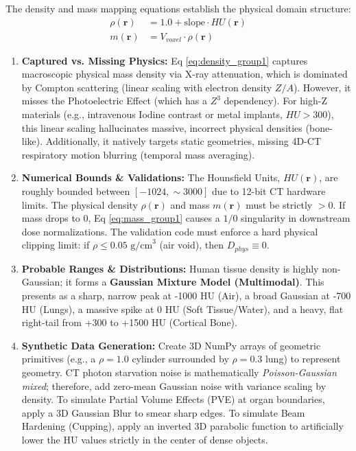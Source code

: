 \documentclass[11pt,a4paper]{article}
\begin{document}
The density and mass mapping equations establish the physical domain structure:
\begin{align}
    \rho(\mathbf{r}) &= 1.0 + \text{slope} \cdot HU(\mathbf{r}) \label{eq:density_group1} \\
    m(\mathbf{r}) &= V_{voxel} \cdot \rho(\mathbf{r}) \label{eq:mass_group1}
\end{align}

\begin{enumerate}
    \item \textbf{Captured vs. Missing Physics:} Eq \ref{eq:density_group1} captures macroscopic physical mass density via X-ray attenuation, which is dominated by Compton scattering (linear scaling with electron density $Z/A$). However, it misses the Photoelectric Effect (which has a $Z^3$ dependency). For high-Z materials (e.g., intravenous Iodine contrast or metal implants, $HU > 300$), this linear scaling hallucinates massive, incorrect physical densities (bone-like). Additionally, it natively targets static geometries, missing 4D-CT respiratory motion blurring (temporal mass averaging).
    \item \textbf{Numerical Bounds \& Validations:} The Hounsfield Units, $HU(\mathbf{r})$, are roughly bounded between $[-1024, \sim 3000]$ due to 12-bit CT hardware limits. The physical density $\rho(\mathbf{r})$ and mass $m(\mathbf{r})$ must be strictly $> 0$. If mass drops to 0, Eq \ref{eq:mass_group1} causes a $1/0$ singularity in downstream dose normalizations. The validation code must enforce a hard physical clipping limit: if $\rho \le 0.05 \text{ g/cm}^3$ (air void), then $D_{phys} \equiv 0$.
    \item \textbf{Probable Ranges \& Distributions:} Human tissue density is highly non-Gaussian; it forms a \textbf{Gaussian Mixture Model (Multimodal)}. This presents as a sharp, narrow peak at -1000 HU (Air), a broad Gaussian at -700 HU (Lungs), a massive spike at 0 HU (Soft Tissue/Water), and a heavy, flat right-tail from +300 to +1500 HU (Cortical Bone).
    \item \textbf{Synthetic Data Generation:} Create 3D NumPy arrays of geometric primitives (e.g., a $\rho=1.0$ cylinder surrounded by $\rho=0.3$ lung) to represent geometry. CT photon starvation noise is mathematically \textit{Poisson-Gaussian mixed}; therefore, add zero-mean Gaussian noise with variance scaling by density. To simulate Partial Volume Effects (PVE) at organ boundaries, apply a 3D Gaussian Blur to smear sharp edges. To simulate Beam Hardening (Cupping), apply an inverted 3D parabolic function to artificially lower the HU values strictly in the center of dense objects.
\end{enumerate}
\end{document}
